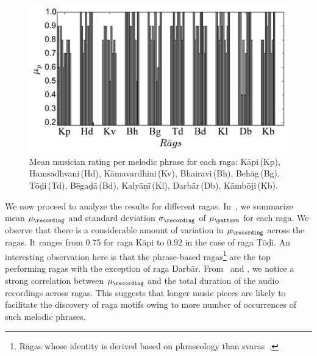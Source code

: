 {\begin{figure}
	\begin{center}
		\includegraphics[width=\figSizeSixty]{ch06_patterns/figures/Characterization/per_raaga_per_phrase_rating.pdf}
	\end{center}
	\caption[Mean musician ratings for the discovered melodic phrases]{Mean musician rating per melodic phrase for each \gls{raga}: K\={a}pi\,(Kp), Hamsadhvani\,(Hd), K\={a}mavardhini\,(Kv), Bhairavi\,(Bh), Beh\={a}g\,(Bg), T\={o}\d{d}i\,(Td), B\={e}ga\d{d}\={a}\,(Bd), Kaly\={a}\d{n}\={i}\,(Kl), Darb\={a}r\,(Db), K\={a}mb\={o}ji\,(Kb).}
	\label{fig:average_rating_pattern_characterization}
\end{figure}


We now proceed to analyze the results for different \glspl{raga}. In~, we summarize mean $\mu_\recording$ and standard deviation $\sigma_\recording$ of $\mu_\pattern$ for each \gls{raga}. We observe that there is a considerable amount of variation in $\mu_\recording$ across the \glspl{raga}. It ranges from 0.75 for \gls{raga} K\={a}pi to 0.92 in the case of \gls{raga} T\={o}\d{d}i. An interesting observation here is that the phrase-based \glspl{raga}\footnote{R\={a}gas whose identity is derived based on phraseology than svaras~\cite{krishna2012carnatic}.} are the top performing \glspl{raga} with the  exception of \gls{raga} Darb\={a}r. From~ and , we notice a strong correlation between $\mu_\recording$ and the total duration of the audio recordings across \glspl{raga}. This suggests that longer music pieces are likely to facilitate the discovery of \gls{raga} motifs owing to more number of occurrences of such melodic phrases.

}
